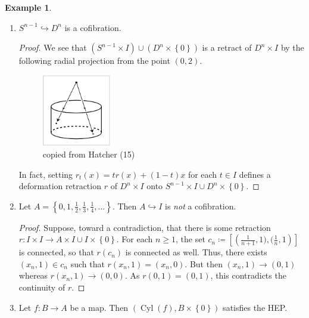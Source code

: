 \documentclass[10pt,letterpaper,cm]{nupset}
\theoremstyle{definition}
\newtheorem{exmp}[definition]{Example}
\theoremstyle{theorem}
\theoremstyle{remark}
\newcommand{\1}{\mathbb{1}}
\newcommand{\0}{\vec 0}
\DeclareMathOperator{\cyl}{Cyl}
\begin{document}
\begin{exmp}\label{ex12} $ $
\begin{enumerate}[label=(\alph*)]
\item $S^{n-1} \hookrightarrow D^n$ is a cofibration. 
\begin{proof}
We see that $\left(S^{n-1} \times I\right) \cup \left(D^n \times \left\{0\right\}\right)$ is a retract of $D^n \times I$ by the following radial projection from the point $\left(0,2\right)$.
\begin{figure}[H]
\centering
\includegraphics[width=30mm]{Hatcher-radial_proj.png}
\caption{copied from Hatcher (15) \label{overflow}}
\end{figure} In fact, setting $r_t(x) = tr(x) +(1-t)x$ for each $t\in I$ defines a deformation retraction $r$ of $D^n \times I$ onto $S^{n-1} \times I \cup D^n \times \left\{0\right\}$.
\end{proof}
\item Let $A= \left\{0, 1, \frac{1}{2}, \frac{1}{3}, \frac{1}{4}, \ldots\right\}$. Then $A \hookrightarrow I$ is \emph{not} a cofibration.
\begin{proof}
Suppose, toward a contradiction, that there is some retraction $r: I \times I \to A \times I \cup I \times \left\{0\right\}$. For each $n\geq 1$, the set $c_n \coloneqq  \left[\left(\frac{1}{n+1}, 1), (\frac{1}{n}, 1\right)\right]$ is connected, so that $r(c_n)$ is connected as well. Thus, there exists $\left(x_n, 1\right) \in c_n$ such that $r(x_n, 1) = \left(x_n ,0\right)$. But then $\left(x_n, 1\right) \to \left(0, 1\right)$ whereas $r(x_n, 1) \to \left(0, 0\right)$. As $r(0,1) = \left(0,1\right)$, this contradicts the continuity of $r$. 
\end{proof}
\item Let $f: B \to A$ be a map. Then $\left(\cyl(f), B \times \left\{0\right\}\right)$ satisfies the HEP.
\end{enumerate}
\end{exmp}
\end{document}
